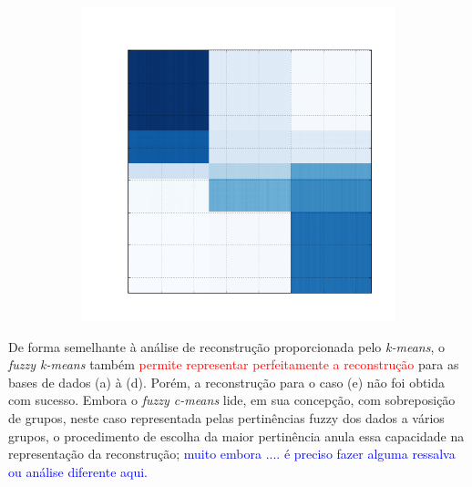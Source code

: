 \documentclass[
    12pt,                %
    oneside,            %
    a4paper,            %
    english,            %
    brazil                %
    ]{abntex2ppgsi}
\begin{document}
\begin{figure}[H]
\begin{subfigure}[b]{0.18\textwidth}
        \caption{}
    \end{subfigure}
    \begin{subfigure}[b]{0.18\textwidth}
        \includegraphics[width=\textwidth]{img/e-reconstruction-fkmeans.png}
        \caption{}
    \end{subfigure}
    \label{fig:reconstruction:fkmeans}
        \label{fig:reconstruction:kmeans}
\end{figure}



De forma semelhante à análise de reconstrução proporcionada pelo \textit{k-means}, o \textit{fuzzy k-means} também \textcolor{red}{permite representar perfeitamente a reconstrução} para as bases de dados (a) à (d). Porém, a reconstrução para o caso (e) não foi obtida com sucesso. Embora o \textit{fuzzy c-means} lide, em sua concepção, com sobreposição de grupos, neste caso representada pelas pertinências fuzzy dos dados a vários grupos, o procedimento de escolha da maior pertinência anula essa capacidade na representação da reconstrução; \textcolor{blue}{muito embora .... é preciso fazer alguma ressalva ou análise diferente aqui.}
\end{document}
